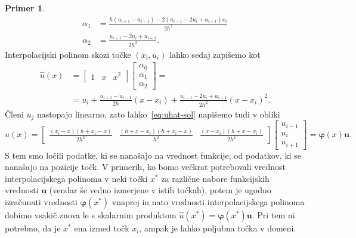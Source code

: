 \documentclass[12pt,a4paper,twoside]{article}
\theoremstyle{definition} %
\newtheorem{primer}[definicija]{Primer}
\theoremstyle{plain} %
\numberwithin{equation}{section}
\renewcommand{\b}{\boldsymbol}
\renewcommand{\phi}{\varphi}
\begin{document}
\begin{primer}
\begin{align}
  \alpha_1 &= \frac{h (u_{i+1}-u_{i-1})-2 (u_{i-1}-2 u_{i}+u_{i+1}) x_i}{2 h^2} \\
  \alpha_2 &= \frac{u_{i-1}-2 u_{i}+u_{i+1}}{2 h^2}.
\end{align}
Interpolacijski polinom skozi točke $(x_i, u_i)$ lahko sedaj zapišemo kot
\begin{align}
  \hat{u}(x) &=
  \begin{bmatrix}
    1 & x & x^2
  \end{bmatrix}
  \begin{bmatrix}
    \alpha_0 \\ \alpha_1 \\ \alpha_2
  \end{bmatrix} = \nonumber \\
  &= u_i +\frac{u_{i+1}-u_{i-1}}{2 h}(x-x_i)+\frac{u_{i-1}-2 u_{i}+u_{i+1}}{2
  h^2}(x-x_i)^2. \label{eq:uhat-sol}
\end{align}
Členi $u_j$ nastopajo linearno, zato lahko~\eqref{eq:uhat-sol} napišemo tudi v obliki
\begin{equation}
  \hat{u}(x) =
  \begin{bmatrix}
  \frac{(x_i-x) (h+x_i-x)}{2 h^2} & \frac{(h+x-x_i)(h+x_i-x)}{h^2} & \frac{(x-x_i) (h+x-x_i)}{2 h^2}
  \end{bmatrix}
  \begin{bmatrix}
    u_{i-1} \\ u_{i} \\ u_{i+1}
  \end{bmatrix}= \b\phi(x)\b u.
\end{equation}
S tem smo ločili podatke, ki se nanašajo na vrednost funkcije, od podatkov, ki se nanašajo na
pozicije točk. V primerih, ko bomo večkrat potrebovali vrednost interpolacijskega polinoma v neki
točki $x^\ast$ za različne nabore funkcijskih vrednosti $\b u$ (vendar še vedno izmerjene v istih
točkah), potem je ugodno izračunati vrednosti $\b\phi(x^\ast)$ vnaprej in nato vrednosti
interpolacijskega polinoma dobimo vsakič znova le s skalarnim produktom $\hat u(x^\ast) =
\b\phi(x^\ast) \b u$. Pri tem ni potrebno, da je $x^\ast$ ena izmed točk $x_i$, ampak je lahko
poljubna točka v domeni.


\end{primer}
\end{document}
